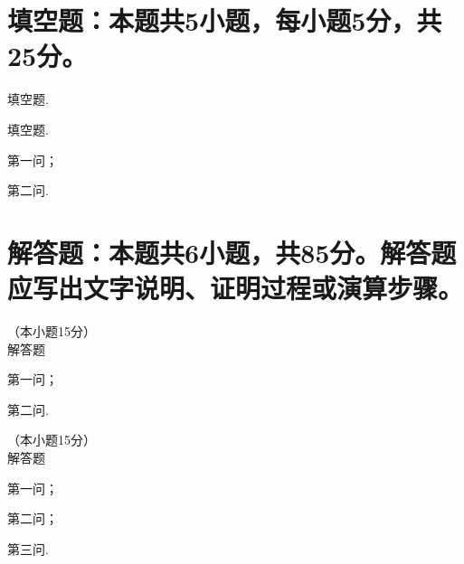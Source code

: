\documentclass[12pt, a4paper]{article}
\begin{document}
\section{填空题：本题共\textmd{\textrm{5}}小题，每小题\textmd{\textrm{5}}分，共\textmd{\textrm{25}}分。}
\begin{question}[resume]
    \item 填空题\underline{\hspace{3em}}.
    \item 填空题.
    \begin{question}
        \item 第一问\underline{\hspace{3em}}；
        \item 第二问\underline{\hspace{3em}}.
    \end{question}
\end{question}

\section{解答题：本题共\textmd{\textrm{6}}小题，共\textmd{\textrm{85}}分。解答题应写出文字说明、证明过程或演算步骤。}
\begin{question}[resume]
    \item （本小题15分） \\
    解答题
    \begin{question}
        \item 第一问；
        \item 第二问.
    \end{question}
    \item （本小题15分） \\
    解答题
    \begin{question}
        \item 第一问；
        \item 第二问；
        \item 第三问.
    \end{question}
\end{question}
\end{document}
